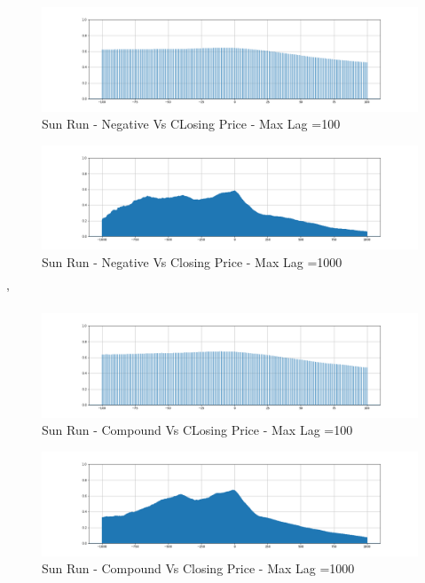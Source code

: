 \documentclass[sigconf, nonacm]{acmart}
\begin{document}
\begin{figure}[H]
  \centering
  \includegraphics[width=\linewidth]{images/srun_100_pos.png}
  \caption{Sun Run - Negative Vs CLosing Price - Max Lag =100}
  \label{srun_100_pos}
\end{figure}

\begin{figure}[H]
  \centering
  \includegraphics[width=\linewidth]{images/srun_1000_neg.png}
  \caption{Sun Run - Negative Vs Closing Price - Max Lag =1000}
  \label{srun_1000_neg}
\end{figure}

'%
\begin{figure}[H]
  \centering
  \includegraphics[width=\linewidth]{images/srun_100_comp.png}
  \caption{Sun Run - Compound Vs CLosing Price - Max Lag =100}
  \label{srun_100_comp}
\end{figure}

\begin{figure}[H]
  \centering
  \includegraphics[width=\linewidth]{images/srun_1000_comp.png}
  \caption{Sun Run - Compound Vs Closing Price - Max Lag =1000}
  \label{srun_1000_comp}
\end{figure}
\end{document}

